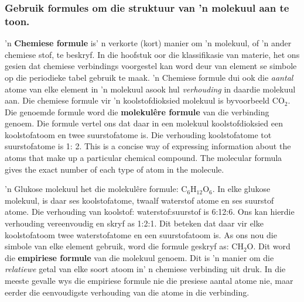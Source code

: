 \subsubsection*{Gebruik formules om die struktuur van 'n molekuul aan te toon.}
'n \textbf{Chemiese formule} is' n verkorte (kort) manier om 'n molekuul, of 'n ander chemiese stof, te beskryf. In die hoofstuk oor die klassifikasie van materie, het ons gesien dat chemiese verbindings voorgestel kan word deur van element se simbole op die periodieke tabel gebruik te maak. 'n Chemiese formule dui ook die \textsl{aantal} atome van elke element in 'n molekuul asook hul \textsl{verhouding} in daardie molekuul aan. Die chemiese formule vir 'n koolstofdioksied molekuul is byvoorbeeld ${\text{CO}}_{2}$. Die genoemde formule word die \textbf{molekul\^{e}re formule} van die verbinding genoem. Die formule vertel ons dat daar in een molekuul koolstofdioksied een koolstofatoom en twee suurstofatome is. Die verhouding koolstofatome tot suurstofatome is 1: 2.
        \label{m38120*fhsst!!!underscore!!!id87}
  {This is a concise way of expressing information about the atoms that make up a particular chemical compound. The molecular formula gives the exact number of each type of atom in the molecule. } 

'n Glukose molekuul het die molekulêre formule: ${\text{C}}_{6}{\text{H}}_{12}{\text{O}}_{6}$. In elke glukose molekuul, is daar ses koolstofatome, twaalf waterstof atome en ses suurstof atome. Die verhouding van koolstof: waterstof:suurstof is 6:12:6. Ons kan hierdie verhouding vereenvoudig en skryf as 1:2:1. Dit beteken dat daar vir elke koolstofatoom twee waterstofatome en een suurstofatoom is. As ons nou die simbole van elke element  gebruik, word die formule geskryf as: ${\text{CH}}_{2}\text{O}$. Dit word die \textbf{empiriese formule} van die molekuul genoem.
        \label{m38120*fhsst!!!underscore!!!id93}
 { Dit is 'n manier om die \textsl{relatiewe} getal van elke soort atoom in' n chemiese verbinding uit druk. In die meeste gevalle wys die empiriese formule nie die presiese aantal atome nie, maar eerder die eenvoudigste verhouding van die atome in die verbinding.} 

